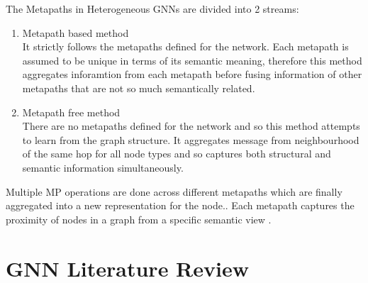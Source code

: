 \documentclass{report} %
\begin{document}
The Metapaths in Heterogeneous \ac{GNN}s are divided into 2 streams:
\begin{enumerate}
    \item Metapath based method\\
    It strictly follows the metapaths defined for the network.
    Each metapath is assumed to be unique in terms of its semantic meaning, therefore this method aggregates inforamtion from each metapath before fusing 
    information of other metapaths that are not so much semantically related.
    \item Metapath free method\\
    There are no metapaths defined for the network and so this method attempts to learn from the graph structure.
    It aggregates message from neighbourhood of the same hop for all node types and so captures both structural and semantic information simultaneously.
\end{enumerate}

Multiple \ac{MP} operations are done across different metapaths which are finally aggregated into a new representation for the node.\cite{ML HGNN-2023}.
Each metapath captures the proximity of nodes in a graph from a specific semantic view \cite{HGNN-2020}.

\section{\ac{GNN} Literature Review}\label{sec:GNN Literature Review}
\end{document}
